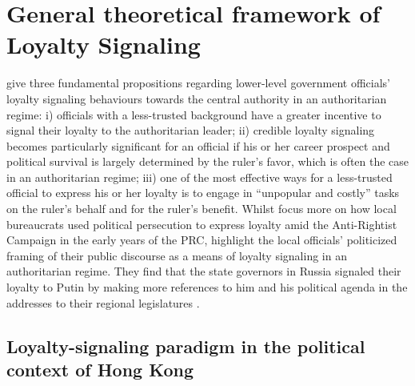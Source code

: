 \documentclass[9pt,a4paper,twocolumn,twoside]{rho-class/rho}
\begin{document}
    
\section{General theoretical framework of Loyalty Signaling}

    \textcite{qian2024loyalty} give three fundamental propositions regarding lower-level government officials' loyalty signaling behaviours towards the central authority in an 
    authoritarian regime: i) officials with a less-trusted background have a greater incentive to signal their loyalty to the authoritarian leader; ii) credible loyalty signaling 
    becomes particularly significant for an official if his or her career prospect and political survival is largely determined by the ruler's favor, which is often the case in an 
    authoritarian regime; iii) one of the most effective ways for a less-trusted official to express his or her loyalty is to engage in ``unpopular and costly'' tasks on the ruler's 
    behalf and for the ruler's benefit. Whilst \textcite{qian2024loyalty} focus more on how local bureaucrats used political persecution to express loyalty amid the Anti-Rightist 
    Campaign in the early years of the PRC, \textcite{baturo2025personalization} highlight the local officials' politicized framing of their public discourse as a means of loyalty signaling 
    in an authoritarian regime. They find that the state governors in Russia signaled their loyalty to Putin by making more references to him and his political agenda in the 
    addresses to their regional legislatures \parencite{baturo2025personalization}. 

    \subsection{Loyalty-signaling paradigm in the political context of Hong Kong}
\end{document}
